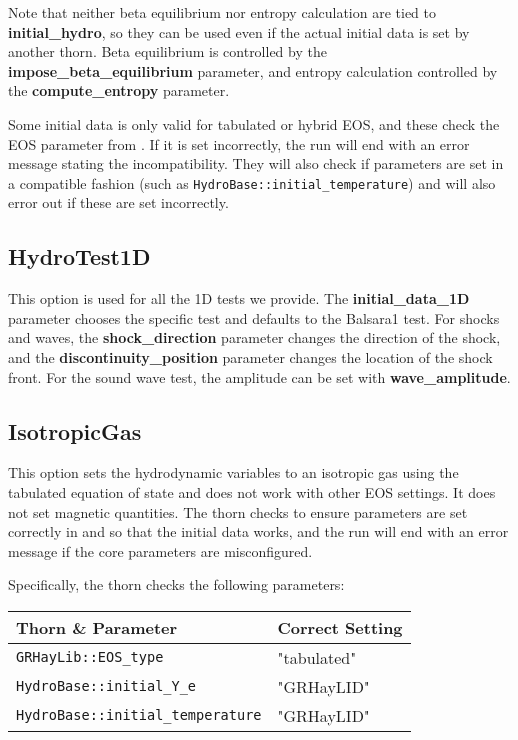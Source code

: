 \documentclass{article}
\begin{document}
Note that neither beta equilibrium nor entropy calculation are
tied to \textbf{initial\_hydro}, so they can be used even if
the actual initial data is set by another thorn. Beta equilibrium
is controlled by the \textbf{impose\_beta\_equilibrium} parameter,
and entropy calculation controlled by the \textbf{compute\_entropy}
parameter.

Some initial data is only valid for tabulated or hybrid EOS, and
these check the EOS parameter from \glib. If it is set incorrectly,
the run will end with an error message stating the incompatibility.
They will also check if \hbase{} parameters are set in a compatible
fashion (such as \texttt{HydroBase::initial\_temperature}) and
will also error out if these are set incorrectly.

\subsection{HydroTest1D}

This option is used for all the 1D tests we provide. The
\textbf{initial\_data\_1D} parameter chooses the
specific test and defaults to the Balsara1 test. For shocks and
waves, the \textbf{shock\_direction} parameter changes the
direction of the shock, and the \textbf{discontinuity\_position}
parameter changes the location of the shock front. For the sound
wave test, the amplitude can be set with \textbf{wave\_amplitude}.

\subsection{IsotropicGas}

This option sets the hydrodynamic variables to an isotropic gas using
the tabulated equation of state and does not work with other EOS
settings. It does not set magnetic quantities. The thorn checks to
ensure parameters are set correctly in \glib and
\hbase so that the initial data works, and the run will end
with an error message if the core parameters are misconfigured.

Specifically, the thorn checks the following parameters:
\begin{tabular}{l|l}
Thorn \& Parameter & Correct Setting \\\hline
\texttt{GRHayLib::EOS\_type} & "tabulated" \\
\texttt{HydroBase::initial\_Y\_e} & "GRHayLID" \\
\texttt{HydroBase::initial\_temperature} & "GRHayLID"
\end{tabular}
\end{document}
